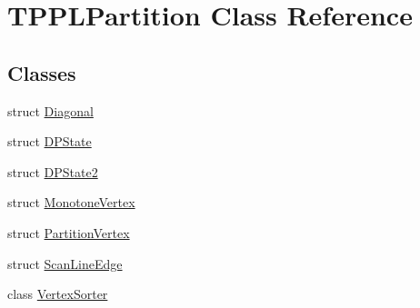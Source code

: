 \hypertarget{class_t_p_p_l_partition}{}\section{T\+P\+P\+L\+Partition Class Reference}
\label{class_t_p_p_l_partition}
\subsection*{Classes}
\begin{DoxyCompactItemize}
\item 
struct \mbox{\hyperlink{struct_t_p_p_l_partition_1_1_diagonal}{Diagonal}}
\item 
struct \mbox{\hyperlink{struct_t_p_p_l_partition_1_1_d_p_state}{D\+P\+State}}
\item 
struct \mbox{\hyperlink{struct_t_p_p_l_partition_1_1_d_p_state2}{D\+P\+State2}}
\item 
struct \mbox{\hyperlink{struct_t_p_p_l_partition_1_1_monotone_vertex}{Monotone\+Vertex}}
\item 
struct \mbox{\hyperlink{struct_t_p_p_l_partition_1_1_partition_vertex}{Partition\+Vertex}}
\item 
struct \mbox{\hyperlink{struct_t_p_p_l_partition_1_1_scan_line_edge}{Scan\+Line\+Edge}}
\item 
class \mbox{\hyperlink{class_t_p_p_l_partition_1_1_vertex_sorter}{Vertex\+Sorter}}
\end{DoxyCompactItemize}
